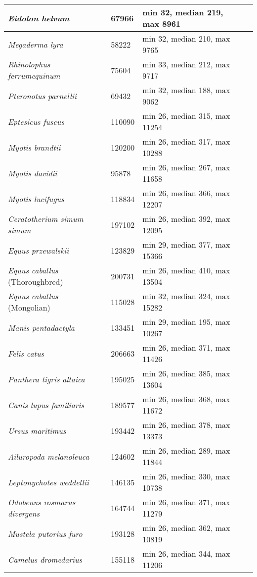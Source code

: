 {\begin{longtable}{| L{4cm} | L{2cm}  | L{5cm} | L{4cm} |}
\textit{Eidolon helvum} & 67966 & min 32, median 219, max 8961 & \\ \hline
\textit{Megaderma lyra} & 58222 & min 32, median 210, max 9765 & \\ \hline
\textit{Rhinolophus ferrumequinum} & 75604 & min 33, median 212, max 9717 & \\ \hline
\textit{Pteronotus parnellii} & 69432 & min 32, median 188, max 9062 & \\ \hline
\textit{Eptesicus fuscus} & 110090 & min 26, median 315, max 11254 & \\ \hline
\textit{Myotis brandtii} & 120200 & min 26, median 317, max 10288 & \\ \hline
\textit{Myotis davidii} & 95878 & min 26, median 267, max 11658 & \\ \hline
\textit{Myotis lucifugus} & 118834 & min 26, median 366, max 12207 & \\ \hline
\textit{Ceratotherium simum simum} & 197102 & min 26, median 392, max 12095 & \\ \hline
\textit{Equus przewalskii} & 123829 & min 29, median 377, max 15366 & \\ \hline
\textit{Equus caballus} (Thoroughbred) & 200731 & min 26, median 410, max 13504 & \\ \hline
\textit{Equus caballus} (Mongolian) & 115028 & min 32, median 324, max 15282 & \\ \hline
\textit{Manis pentadactyla} & 133451 & min 29, median 195, max 10267 & \\ \hline
\textit{Felis catus} & 206663 & min 26, median 371, max 11426 & \\ \hline
\textit{Panthera tigris altaica} & 195025 & min 26, median 385, max 13604 & \\ \hline
\textit{Canis lupus familiaris} & 189577 & min 26, median 368, max 11672 & \\ \hline
\textit{Ursus maritimus} & 193442 & min 26, median 378, max 13373 & \\ \hline
\textit{Ailuropoda melanoleuca} & 124602 & min 26, median 289, max 11844 & \\ \hline
\textit{Leptonychotes weddellii} & 146135 & min 26, median 330, max 10738 & \\ \hline
\textit{Odobenus rosmarus divergens} & 164744 & min 26, median 371, max 11279 & \\ \hline
\textit{Mustela putorius furo} & 193128 & min 26, median 362, max 10819 & \\ \hline
\textit{Camelus dromedarius} & 155118 & min 26, median 344, max 11206 & \\ \hline

\end{longtable}}
